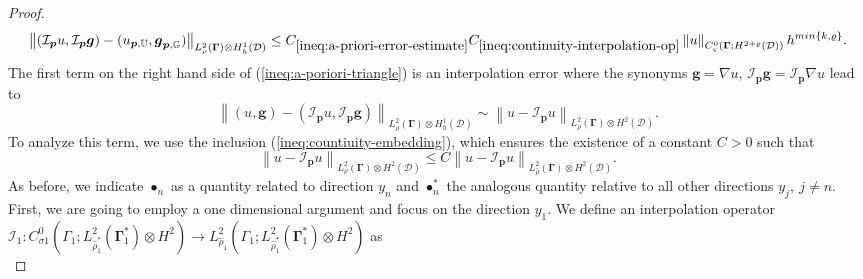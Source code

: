 \documentclass[final,onefignum,onetabnum]{mousaviart}
\begin{document}
\begin{proof}
				\begin{equation}
					\label{ineq:a-poriori-error-space}
					\left\|  (\mathcal{I}_{\boldsymbol{p}} u, \mathcal{I}_{\boldsymbol{p}}\boldsymbol{g}) - (u_{\boldsymbol{p} ,\mathbb{U}}, \boldsymbol{g}_{\boldsymbol{p},\mathbb{G}})\right\| _{ L^2_\rho(\boldsymbol{\Gamma}) \otimes  H^1_h(\mathcal{D}) }
					\leq
					C_{\ref{ineq:a-priori-error-estimate}}
					C_{\ref{ineq:continuity-interpolation-op}} 
					\left\| u  \right\|_{C^0_{\varsigma}\left( \boldsymbol{\Gamma};H^{2+\varrho}(\mathcal{D})\right) } h^{min\lbrace k, \varrho \rbrace }.
				\end{equation}
				The first term on the right hand side of (\ref{ineq:a-poriori-triangle}) is an interpolation error where the synonyms $\boldsymbol{g} = \nabla u$, $\mathcal{I}_{\boldsymbol{p}} \boldsymbol{g} = \mathcal{I}_{\boldsymbol{p}} \nabla u$ lead to
				\begin{equation*}
					\left\|  (u, \boldsymbol{g}) - (\mathcal{I}_{\boldsymbol{p}} u, \mathcal{I}_{\boldsymbol{p}} \boldsymbol{g})\right\| _{ L^2_\rho(\boldsymbol{\Gamma}) \otimes H^1_h(\mathcal{D})}
					\sim
					\left\| u - \mathcal{I}_{\boldsymbol{p}} u \right\|_{L_\rho^2(\boldsymbol{\Gamma}) \otimes H^2(\mathcal{D})}. 
				\end{equation*} 
				To analyze this term, we use the inclusion (\ref{ineq:countiuity-embedding}), which ensures the existence of a constant $C>0$ such that
				\begin{equation*}
					\left\|  u - \mathcal{I}_{\boldsymbol{p}} u \right\|_{ L^2_\rho(\boldsymbol{\Gamma}) \otimes H^2(\mathcal{D})}
					\leq
					C
					\left\|  u - \mathcal{I}_{\boldsymbol{p}} u \right\| _{L^2_{\hat{\rho}}(\boldsymbol{\Gamma}) \otimes H^2(\mathcal{D})}.
				\end{equation*}
				As before, we indicate $\bullet_n$ as a quantity related to direction $y_n$ and $\bullet_n^*$ the analogous quantity relative to all other directions $y_j, ~ j\neq n$. First, we are going to employ a one dimensional argument and focus on the direction $y_1$. We define an interpolation operator $\mathcal{I}_1: C_{\sigma1}^0\left( \Gamma_1; L_{\hat{\rho}_1^*}^2(\boldsymbol{\Gamma}_1^*) \otimes  H^2 \right)  \rightarrow L_{\hat{\rho}_1}^2 \left( \Gamma_1; L_{\hat{\rho}_1^*}^2(\boldsymbol{\Gamma}_1^*) \otimes H^2 \right)$ as
				\begin{equation*}

\end{equation*}
\end{proof}
\end{document}
